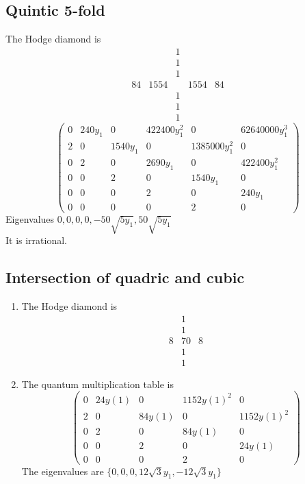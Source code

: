 \documentclass[11pt]{amsart}
\newcounter{num}[section] %
\begin{document}
\subsection{Quintic 5-fold}

The Hodge diamond is 
\[
    \begin{array}{ccccc}
         &&1&&  \\
         &&1&&\\
         &&1&&\\
         84&1554&&1554&84\\
            &&1&&  \\
         &&1&&\\
         &&1&&
    \end{array}
\]
\[
\begin{pmatrix}
0 & 240 y_1 & 0 & 422400 y_1^2 & 0 & 62640000 y_1^3 \\
2 & 0 & 1540 y_1 & 0 & 1385000 y_1^2 & 0 \\
0 & 2 & 0 & 2690 y_1 & 0 & 422400 y_1^2 \\
0 & 0 & 2 & 0 & 1540 y_1 & 0 \\
0 & 0 & 0 & 2 & 0 & 240 y_1 \\
0 & 0 & 0 & 0 & 2 & 0
\end{pmatrix}
\]
Eigenvalues $0,0,0,0,-50\sqrt{5y_1} ,50\sqrt{5y_1}$\\
It is irrational.
\subsection{Intersection of quadric and cubic}

\begin{enumerate}
    \item [1)] The Hodge diamond is
    \[
\begin{array}{ccc}
     &1&  \\
     &1&\\
     8&70&8\\
          &1&  \\
     &1&
\end{array}
    \]
    \item[2)]  The quantum multiplication table is
    \[
\begin{pmatrix}
0 & 24y(1) & 0 & 1152y(1)^2 & 0 \\
2 & 0 & 84y(1) & 0 & 1152y(1)^2 \\
0 & 2 & 0 & 84y(1) & 0 \\
0 & 0 & 2 & 0 & 24y(1) \\
0 & 0 & 0 & 2 & 0
\end{pmatrix}
\]
The eigenvalues are $\{0,0,0,12\sqrt{3}y_1 , -12\sqrt{3}y_1\}$
\end{enumerate}
\end{document}
